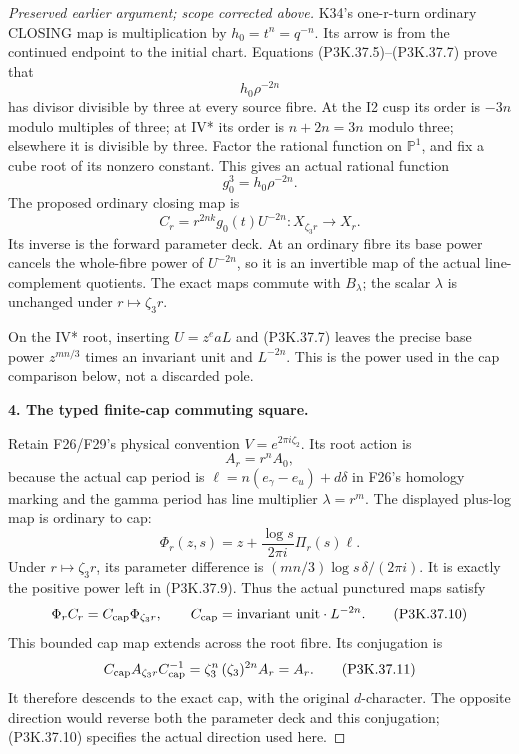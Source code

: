 \begin{proof}[Preserved earlier argument; scope corrected above]
K34's one-r-turn ordinary CLOSING map is multiplication by
\(h_0=t^n=q^{-n}\). Its arrow is from the continued endpoint to the
initial chart. Equations (P3K.37.5)--(P3K.37.7) prove that
\[
                    h_0\rho^{-2n}
\]
has divisor divisible by three at every source fibre. At the I2 cusp its
order is \(-3n\) modulo multiples of three; at IV* its order is
\(n+2n=3n\) modulo three; elsewhere it is divisible by three.
Factor the rational function on \(\mathbb P^1\), and fix a cube root
of its nonzero constant. This gives an actual rational function
\[
                    g_0^3=h_0\rho^{-2n}.                         \tag{P3K.37.8}
\]
The proposed ordinary closing map is
\[
 C_r=r^{2nk}g_0(t)U^{-2n}: X_{\zeta_3r}\longrightarrow X_r.
                                                                    \tag{P3K.37.9}
\]
Its inverse is the forward parameter deck. At an ordinary fibre its base
power cancels the whole-fibre power of \(U^{-2n}\), so it is an
invertible map of the actual line-complement quotients. The exact maps
commute with \(B_\lambda\); the scalar \(\lambda\) is unchanged
under \(r\mapsto\zeta_3r\).

On the IV* root, inserting \(U=z^eaL\) and (P3K.37.7) leaves the precise
base power \(z^{mn/3}\) times an invariant unit and \(L^{-2n}\).
This is the power used in the cap comparison below, not a discarded pole.

\par\medskip\noindent\textbf{4. The typed finite-cap commuting square.}\enspace

Retain F26/F29's physical convention \(V=e^{2\pi i\zeta_2}\).
Its root action is
\[
 A_r=r^n A_0,
\]
because the actual cap period is
\(\ell=n(e_\gamma-e_u)+d\delta\) in F26's homology marking and the
gamma period has line multiplier \(\lambda=r^m\).
The displayed plus-log map is ordinary to cap:
\[
 \Phi_r(z,s)=z+\frac{\log s}{2\pi i}\Pi_r(s)\ell.
\]
Under \(r\mapsto\zeta_3r\), its parameter difference is
\((mn/3)\log s\,\delta/(2\pi i)\). It is exactly the positive
power left in (P3K.37.9). Thus the actual punctured maps satisfy
\[
 \Phi_r C_r=C_{\rm cap}\Phi_{\zeta_3r},\qquad
 C_{\rm cap}=\text{invariant unit}\cdot L^{-2n}.                 \tag{P3K.37.10}
\]
This bounded cap map extends across the root fibre. Its conjugation is
\[
 C_{\rm cap} A_{\zeta_3r} C_{\rm cap}^{-1}
   =\zeta_3^n\,(\zeta_3)^{2n} A_r=A_r.                         \tag{P3K.37.11}
\]
It therefore descends to the exact cap, with the original \(d\)-character.
The opposite direction would reverse both the parameter deck and this
conjugation; (P3K.37.10) specifies the actual direction used here.


\end{proof}
